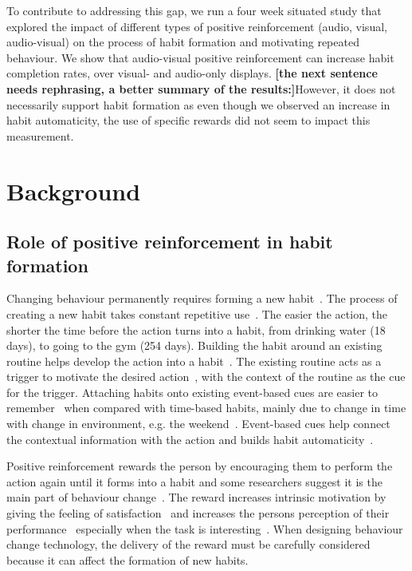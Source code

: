 \documentclass{scaffold/sigchi}
\begin{document}
To contribute to addressing this gap, we run a four week situated study that explored the impact of different types of positive reinforcement (audio, visual, audio-visual) on the process of habit formation and motivating repeated behaviour.
We show that audio-visual positive reinforcement can increase habit completion rates, over visual- and audio-only displays. 
\textbf{[the next sentence needs rephrasing, a better summary of the results:]}However, it does not necessarily support habit formation as even though we observed an increase in habit automaticity, the use of specific rewards did not seem to impact this measurement.
%

\section{Background}
\subsection{Role of positive reinforcement in habit formation}
Changing behaviour permanently requires forming a new habit~\cite{article_experiences_of_habit_formation}. The process of creating a new habit takes constant repetitive use~\cite{article_how_habits_formed_modelling_habit_formation}. The easier the action, the shorter the time before the action turns into a habit, from drinking water (18 days), to going to the gym (254 days). Building the habit around an existing routine helps develop the action into a habit~\cite{habits_event_cues_1}. The existing routine acts as a trigger to motivate the desired action~\cite{habits_event_cues_2}, with the context of the routine as the cue for the trigger. Attaching habits onto existing event-based cues are easier to remember~\cite{article_implementation_intentions_multicue} when compared with time-based habits, mainly due to change in time with change in environment, e.g. the weekend~\cite{coaching_not_that_good}. Event-based cues help connect the contextual information with the action and builds habit automaticity~\cite{article_implementation_intentions}.

Positive reinforcement rewards the person by encouraging them to perform the action again until it forms into a habit and some researchers suggest it is the main part of behaviour change~\cite{article_a_self_efficacy}. The reward increases intrinsic motivation by giving the feeling of satisfaction~\cite{article_promoting_habit_formation} and increases the persons perception of their performance~\cite{positive_reinforcement_pro} especially when the task is interesting~\cite{article_meta_analytic_review_intrinsic_motivation}. When designing behaviour change technology, the delivery of the reward must be carefully considered because it can affect the formation of new habits.
\end{document}
